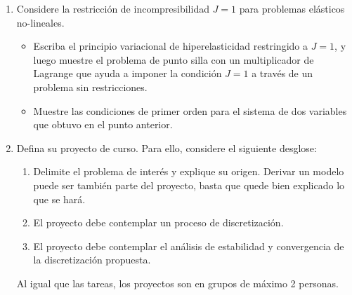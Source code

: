 \documentclass{article}
\begin{document}
\begin{enumerate}
    \item Considere la restricción de incompresibilidad $J=1$ para problemas elásticos no-lineales. 
        \begin{itemize}
            \item{} Escriba el principio variacional de hiperelasticidad restringido a $J=1$, y luego muestre el problema de punto silla con un multiplicador de Lagrange que ayuda a imponer la condición $J=1$ a través de un problema sin restricciones.
            \item{} Muestre las condiciones de primer orden para el sistema de dos variables que obtuvo en el punto anterior.
        \end{itemize}


    \item{} Defina su proyecto de curso. Para ello, considere el siguiente desglose: 
            \begin{enumerate}
                \item Delimite el problema de interés y explique su origen. Derivar un modelo puede ser también parte del proyecto, basta que quede bien explicado lo que se hará. 
                \item El proyecto debe contemplar un proceso de discretización.
                \item El proyecto debe contemplar el análisis de estabilidad y convergencia de la discretización propuesta.
            \end{enumerate}

            Al igual que las tareas, los proyectos son en grupos de máximo 2 personas.


\end{enumerate} %
\end{document}
